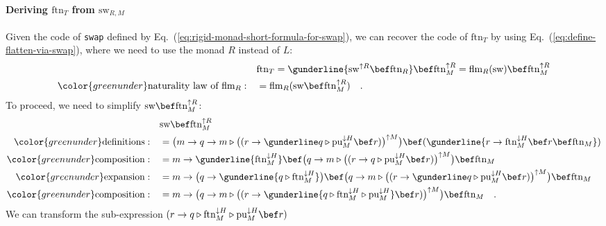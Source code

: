 \paragraph{Deriving $\text{ftn}_{T}$ from $\text{sw}_{R,M}$}

Given the code of \lstinline!swap! defined by Eq.~(\ref{eq:rigid-monad-short-formula-for-swap}),
we can recover the code of $\text{ftn}_{T}$ by using Eq.~(\ref{eq:define-flatten-via-swap}),
where we need to use the monad $R$ instead of $L$:
\begin{align}
 & \text{ftn}_{T}=\gunderline{\text{sw}^{\uparrow R}\bef\text{ftn}_{R}}\bef\text{ftn}_{M}^{\uparrow R}=\text{flm}_{R}(\text{sw})\bef\text{ftn}_{M}^{\uparrow R}\nonumber \\
{\color{greenunder}\text{naturality law of }\text{flm}_{R}:}\quad & =\text{flm}_{R}(\text{sw}\bef\text{ftn}_{M}^{\uparrow R})\quad.\label{eq:rigid-monad-ftn-derivation-4a}
\end{align}
To proceed, we need to simplify $\text{sw}\bef\text{ftn}_{M}^{\uparrow R}$:
\begin{align}
 & \text{sw}\bef\text{ftn}_{M}^{\uparrow R}\nonumber \\
{\color{greenunder}\text{definitions}:}\quad & =\big(m\rightarrow q\rightarrow m\triangleright\big((r\rightarrow\gunderline q\triangleright\text{pu}_{M}^{\downarrow H}\bef r)\big)^{\uparrow M}\big)\bef(\gunderline{r\rightarrow\text{ftn}_{M}^{\downarrow H}\bef r\bef\text{ftn}_{M}})\nonumber \\
{\color{greenunder}\text{composition}:}\quad & =m\rightarrow\gunderline{\text{ftn}_{M}^{\downarrow H}}\bef\big(q\rightarrow m\triangleright\big((r\rightarrow q\triangleright\text{pu}_{M}^{\downarrow H}\bef r)\big)^{\uparrow M}\big)\bef\text{ftn}_{M}\nonumber \\
{\color{greenunder}\text{expansion}:}\quad & =m\rightarrow\big(q\rightarrow\gunderline{q\triangleright\text{ftn}_{M}^{\downarrow H}}\big)\bef\big(q\rightarrow m\triangleright\big((r\rightarrow\gunderline q\triangleright\text{pu}_{M}^{\downarrow H}\bef r)\big)^{\uparrow M}\big)\bef\text{ftn}_{M}\nonumber \\
{\color{greenunder}\text{composition}:}\quad & =m\rightarrow\big(q\rightarrow m\triangleright\big((r\rightarrow\gunderline{q\triangleright\text{ftn}_{M}^{\downarrow H}\triangleright\text{pu}_{M}^{\downarrow H}}\bef r)\big)^{\uparrow M}\big)\bef\text{ftn}_{M}\quad.\label{eq:rigid-monad-swap-ftn-derivation4}
\end{align}
We can transform the sub-expression $(r\rightarrow q\triangleright\text{ftn}_{M}^{\downarrow H}\triangleright\text{pu}_{M}^{\downarrow H}\bef r)$
